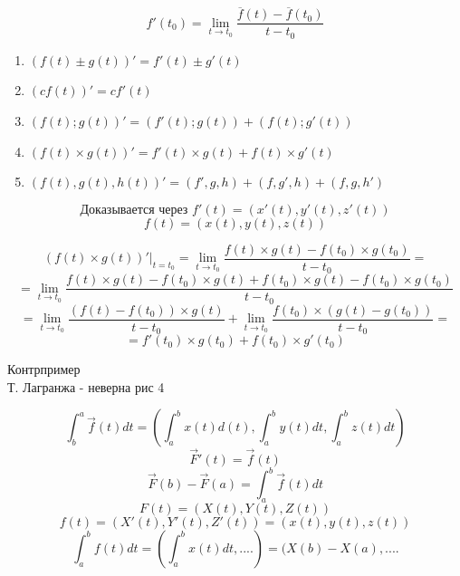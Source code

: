 \documentclass[main]{subfiles}
\begin{document}
    \begin{Definition}
    	\[f'(t_0) = \lim_{t \to t_0} \frac{ \overline{f}(t) - \overline{f}(t_0)}{t - t_0}\]
    \end{Definition}

    \begin{theorem} [свойства]
    		\begin{enumerate}
    			\item $(f(t) \pm g(t))' = f'(t) \pm g'(t)$
    			\item $(c f(t))' = cf'(t)$
    			\item $(f(t); g(t))' = (f'(t); g(t)) + (f(t); g'(t))$
    			\item $(f(t) \times g(t))' = f'(t) \times g(t) + f(t) \times g'(t)$
    			\item $(f(t), g(t), h(t))' = (f', g, h) + (f, g', h) + (f, g, h')$
    		\end{enumerate}
    \end{theorem}

    \begin{Remark}
        \[\text{Доказывается через }f'(t) = (x'(t), y'(t), z'(t))\]
        \[f(t) = (x(t), y(t), z(t))\]
    \end{Remark}

    \begin{Proof}[ВП]
        \[(f(t) \times g(t))'|_{t = t_0} = \lim_{t \to t_0} \frac{f(t) \times g(t) - f(t_0) \times g(t_0)}{t - t_0} = \]
        \[= \lim_{t \to t_0} \frac{f(t) \times g(t) - f(t_0) \times g(t) + f(t_0) \times g(t) - f(t_0) \times g(t_0)}{t - t_0}\]
        \[= \lim_{t \to t_0} \frac{(f(t) - f(t_0)) \times g(t)}{t - t_0} +
        \lim_{t \to t_0} \frac{f(t_0) \times (g(t) - g(t_0))}{t - t_0} = \]
        \[= f'(t_0) \times g(t_0) + f(t_0) \times g'(t_0)\]
    \end{Proof}

    \begin{example}
    		Контрпример\\
    		Т. Лагранжа  - неверна рис 4
    \end{example}

    \[\int_b^a \overrightarrow{f}(t) dt = (\int_a^b x(t)d(t), \int_a^b y(t)dt, \int_a^b z(t)dt) \]
    \[\overrightarrow{F}'(t) = \overrightarrow{f}(t)\]
    \[\overrightarrow{F}(b) - \overrightarrow{F}(a) = \int_a^b \overrightarrow{f}(t)dt\]
    \[F(t) = (X(t), Y(t), Z(t))\]
    \[f(t) = (X'(t), Y'(t), Z'(t)) = (x(t), y(t), z(t))\]
    \[\int_a^b f(t)dt = (\int_a^b x(t) dt, ....) = (X(b) - X(a), ....\]
\end{document}
